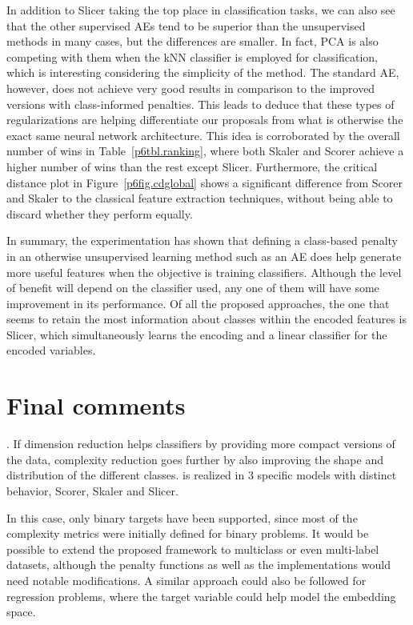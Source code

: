 In addition to Slicer taking the top place in classification tasks, we can also see that the other supervised AEs tend to be superior than the unsupervised methods in many cases, but the differences are smaller. In fact, PCA is also competing with them when the kNN classifier is employed for classification, which is interesting considering the simplicity of the method. The standard AE, however, does not achieve very good results in comparison to the improved versions with class-informed penalties. This leads to deduce that these types of regularizations are helping differentiate our proposals from what is otherwise the exact same neural network architecture. This idea is corroborated by the overall number of wins in Table~\ref{p6tbl.ranking}, where both Skaler and Scorer achieve a higher number of wins than the rest except Slicer.  Furthermore, the critical distance plot in Figure~\ref{p6fig.cdglobal} shows a significant difference from Scorer and Skaler to the classical feature extraction techniques, without being able to discard whether they perform equally.

In summary, the experimentation has shown that defining a class-based penalty in an otherwise unsupervised learning method such as an AE does help generate more useful features when the objective is training classifiers. Although the level of benefit will depend on the classifier used, any one of them will have some improvement in its performance. Of all the proposed approaches, the one that seems to retain the most information about classes within the encoded features is Slicer, which simultaneously learns the encoding and a linear classifier for the encoded variables.


\section{Final comments}\label{p6sec.comments}

. If dimension reduction helps classifiers by providing more compact versions of the data, complexity reduction goes further by also improving the shape and distribution of the different classes.  is realized in 3 specific models with distinct behavior, Scorer, Skaler and Slicer. 

 In this case, only binary targets have been supported, since most of the complexity metrics were initially defined for binary problems. It would be possible to extend the proposed framework to multiclass or even multi-label datasets, although the penalty functions as well as the implementations would need notable modifications. A similar approach could also be followed for regression problems, where the target variable could help model the embedding space.

